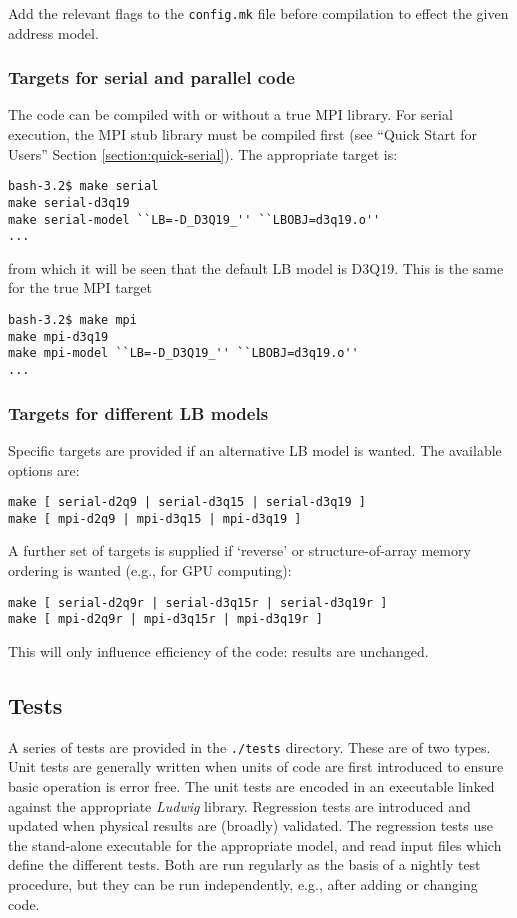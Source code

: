 Add the relevant flags to the \texttt{config.mk} file before
compilation to effect the given address model.

\subsubsection{Targets for serial and parallel code}

The code can be compiled with or without a true MPI library.
For serial execution, the MPI stub library must be compiled
first (see ``Quick Start for Users'' Section \ref{section:quick-serial}).
The appropriate target is:
\begin{lstlisting}
bash-3.2$ make serial
make serial-d3q19
make serial-model ``LB=-D_D3Q19_'' ``LBOBJ=d3q19.o''
...
\end{lstlisting}
from which it will be seen that the default LB model is D3Q19. This is
the same for the true MPI target
\begin{lstlisting}
bash-3.2$ make mpi
make mpi-d3q19
make mpi-model ``LB=-D_D3Q19_'' ``LBOBJ=d3q19.o''
...
\end{lstlisting}

\subsubsection{Targets for different LB models}

Specific targets are provided if an alternative LB model is wanted.
The available options are:
\begin{lstlisting}
make [ serial-d2q9 | serial-d3q15 | serial-d3q19 ]
make [ mpi-d2q9 | mpi-d3q15 | mpi-d3q19 ]
\end{lstlisting}
A further set of targets is supplied if `reverse' or structure-of-array
memory ordering is wanted (e.g., for GPU computing):
\begin{lstlisting}
make [ serial-d2q9r | serial-d3q15r | serial-d3q19r ]
make [ mpi-d2q9r | mpi-d3q15r | mpi-d3q19r ]
\end{lstlisting}
This will only influence efficiency of the code: results are unchanged.

\subsection{Tests}

A series of tests are provided in the \texttt{./tests} directory. These
are of two types. Unit tests are generally written when units of code
are first introduced to ensure basic operation is error free. The unit
tests are encoded in an executable linked against the appropriate
\textit{Ludwig} library.
Regression
tests are introduced and updated when physical results are (broadly)
validated. The regression tests use the stand-alone executable for
the appropriate model, and read input files which define the different
tests.
Both are run regularly as the basis of a nightly test procedure, but
they can be run independently, e.g., after adding or changing code.


